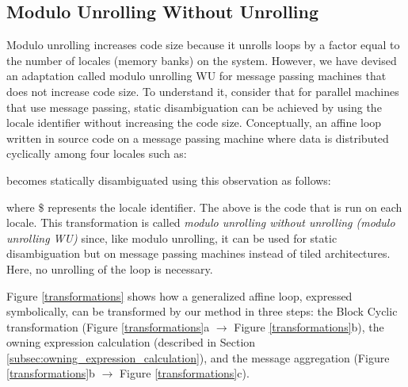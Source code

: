 \subsection{Modulo Unrolling Without Unrolling}\label{subsec:modulo_unrolling_without_unrolling}

Modulo unrolling increases code size because it unrolls loops by a factor equal to the number of locales (memory banks) on the system. However, we have devised an adaptation called modulo unrolling WU for message passing machines that does not increase code size. To understand it, consider that for parallel machines that use message passing, static disambiguation can be achieved by using the locale identifier without increasing the code size. Conceptually, an affine loop written in source code on a message passing machine where data is distributed cyclically among four locales such as:\newline



\tab{\texttt{\}}}\newline

becomes statically disambiguated using this observation as follows:\newline



\tab{\texttt{\}}}\newline

where \$ represents the locale identifier. The above is the code that is run on each locale. This transformation is called \textit{modulo unrolling without unrolling (modulo unrolling WU)} since, like modulo unrolling, it can be used for static disambiguation but on message passing machines instead of tiled architectures. Here, no unrolling of the loop is necessary.

Figure \ref{transformations} shows how a generalized affine loop, expressed symbolically, can be transformed by our method in three steps: the Block Cyclic transformation (Figure \ref{transformations}a $\rightarrow$ Figure \ref{transformations}b), the owning expression calculation (described in Section \ref{subsec:owning_expression_calculation}), and the message aggregation (Figure \ref{transformations}b $\rightarrow$ Figure \ref{transformations}c). 

